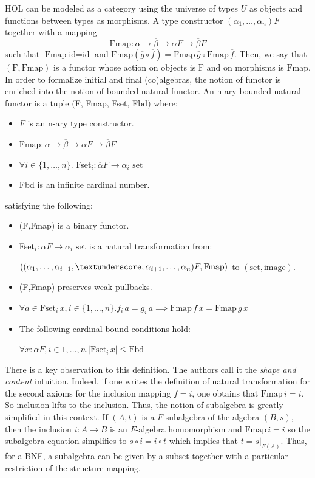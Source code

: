 \documentclass[notitlepage]{article}
\begin{document}
HOL can be modeled as a category using the universe of types $U$ as objects and functions between types as morphisms. A type constructor $(\alpha_1,\ldots,\alpha_n)F$ together with a mapping \[\text{Fmap}: \overline{\alpha} \to \overline{\beta} \to \overline{\alpha} F \to \overline{\beta} F\] such that $\text{Fmap} \; \text{id} = \text{id}$ and $\text{Fmap} (\overline{g} \circ \overline{f}) = \text{Fmap} \, \overline{g} \circ \text{Fmap} \, \overline{f}$. Then, we say that $(\text{F}, \text{Fmap})$ is a functor whose action on objects is $\text{F}$ and on morphisms is $\text{Fmap}$. In order to formalize initial and final (co)algebras, the notion of functor is enriched into the notion of bounded natural functor. An n-ary bounded natural functor is a tuple $($F, Fmap, Fset, Fbd$)$ where:

\begin{itemize}
	\item $F$ is an n-ary type constructor.
	\item $\text{Fmap}: \overline{\alpha} \to \overline{\beta} \to \overline{\alpha} F \to \overline{\beta} F$
	\item $\forall i \in \{1,\ldots,n\}.$ Fset$_i: \overline{\alpha}F \to \alpha_i \text{ set}$
	\item Fbd is an infinite cardinal number.
\end{itemize}

satisfying the following:

\begin{itemize}
	\item (F,Fmap) is a binary functor.
	\item Fset$_i: \overline{\alpha}F \to \alpha_i \text{ set}$ is a natural transformation from:
	
	$((\alpha_1,\ldots,\alpha_{i-1},\textunderscore,\alpha_{i+1},\ldots,\alpha_n)F, \text{Fmap})$ to $(\text{set}, \text{image})$.
	\item (F,Fmap) preserves weak pullbacks.
	\item $\forall a \in \text{Fset}_i \, x,  i \in \{1,\ldots,n\}. f_i \, a = g_i \, a \implies \text{Fmap} \, \overline{f} \, x = \text{Fmap} \, \overline{g} \, x$
	\item The following cardinal bound conditions hold:
	
	$\forall x : \overline{\alpha} F, i \in {1,\ldots,n}. |\text{Fset}_i \, x | \le \text{Fbd}$
\end{itemize}

There is a key observation to this definition. The authors call it the \textit{shape and content} intuition. Indeed, if one writes the definition of natural transformation for the second axioms for the inclusion mapping $f = i$, one obtains that $\text{Fmap} \, i = i$. So inclusion lifts to the inclusion. Thus, the notion of subalgebra is greatly simplified in this context. If $(A,t)$ is a $F$-subalgebra of the algebra $(B,s)$, then the inclusion $i: A \to B$ is an $F$-algebra homomorphism and $\text{Fmap} \, i = i$ so the subalgebra equation simplifies to $s \circ i = i \circ t$ which implies that $t = s|_{F(A)}$. Thus, for a BNF, a subalgebra can be given by a subset together with a particular restriction of the structure mapping.
\end{document}
